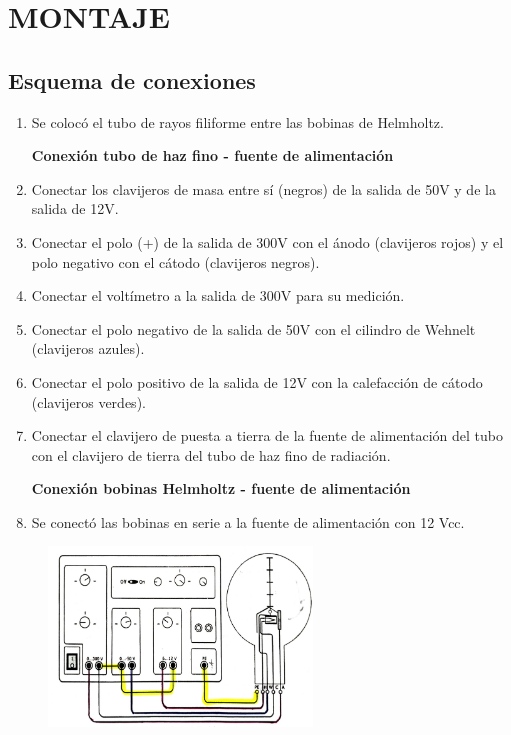\documentclass[a4paper]{article}
\begin{document}
\section{MONTAJE}
    \renewcommand{\theenumi}{\roman{enumi}}

    \subsection{Esquema de conexiones}

        \begin{enumerate}
            \item Se colocó el tubo de rayos filiforme entre las bobinas de Helmholtz.

            \textbf{Conexión tubo de haz fino - fuente de alimentación}

            \item Conectar los clavijeros de masa entre sí (negros) de la salida de 50V y de la salida de 12V.
            \item Conectar el polo (+) de la salida de 300V con el ánodo (clavijeros rojos) y el polo negativo con el cátodo (clavijeros negros).
            \item Conectar el voltímetro a la salida de 300V para su medición.
            \item Conectar el polo negativo de la salida de 50V con el cilindro de Wehnelt (clavijeros azules).
            \item Conectar el polo positivo de la salida de 12V con la calefacción de cátodo (clavijeros verdes).
            \item Conectar el clavijero de puesta a tierra de la fuente de alimentación del tubo con el clavijero de tierra del tubo de haz fino de radiación.

            \textbf{Conexión bobinas Helmholtz - fuente de alimentación}

            \item Se conectó las bobinas en serie a la fuente de alimentación con 12 Vcc.
        \end{enumerate}

        \begin{figure}[h!]
            \centering
            \includegraphics[width = 7cm] {../imagenes/esquemaConexionTuboDeHazFuenteAlim.png}
        \end{figure}
\end{document}
